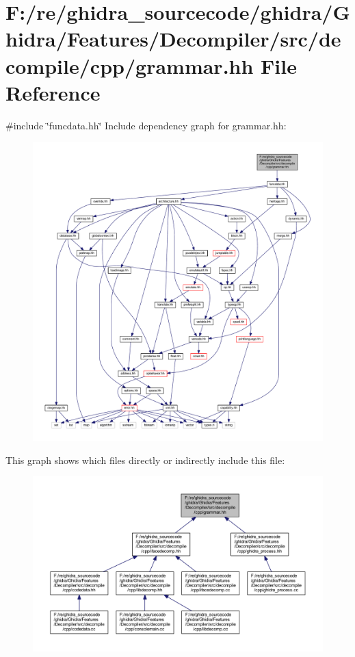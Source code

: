\hypertarget{grammar_8hh}{}\section{F\+:/re/ghidra\+\_\+sourcecode/ghidra/\+Ghidra/\+Features/\+Decompiler/src/decompile/cpp/grammar.hh File Reference}
\label{grammar_8hh}
{\ttfamily \#include \char`\"{}funcdata.\+hh\char`\"{}}\newline
Include dependency graph for grammar.\+hh\+:
\nopagebreak
\begin{figure}[H]
\begin{center}
\leavevmode
\includegraphics[width=350pt]{grammar_8hh__incl}
\end{center}
\end{figure}
This graph shows which files directly or indirectly include this file\+:
\nopagebreak
\begin{figure}[H]
\begin{center}
\leavevmode
\includegraphics[width=350pt]{grammar_8hh__dep__incl}
\end{center}
\end{figure}
